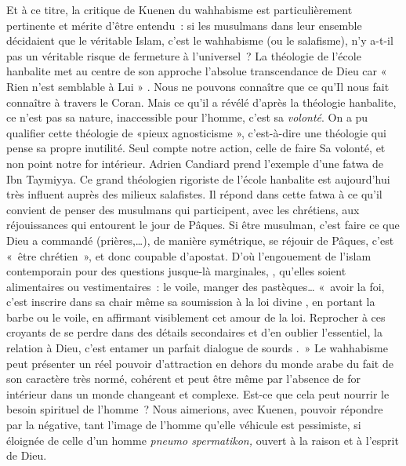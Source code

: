 Et à ce titre, la critique de Kuenen du wahhabisme est particulièrement
pertinente et mérite d'être entendu~: si les musulmans dans leur
ensemble décidaient que le véritable Islam, c'est le wahhabisme (ou le
salafisme), n'y a-t-il pas un véritable risque de fermeture à
l'universel~? La théologie de l'école hanbalite met au
centre de son approche l'absolue transcendance de Dieu car « Rien n'est
semblable à Lui » . Nous ne pouvons connaître
que ce qu'Il nous fait connaître à travers le Coran. Mais ce qu'il a
révélé d'après la théologie hanbalite, ce n'est pas sa nature,
inaccessible pour l'homme, c'est sa \emph{volonté}. On a pu qualifier
cette théologie de «pieux agnosticisme », c'est-à-dire une théologie qui
pense sa propre inutilité. Seul compte notre action, celle de faire Sa
volonté, et non point notre for intérieur. Adrien Candiard prend
l'exemple d'une fatwa de Ibn Taymiyya. Ce grand théologien rigoriste de
l'école hanbalite est aujourd'hui très influent auprès des milieux
salafistes. Il répond dans cette fatwa à ce qu'il convient de penser des
musulmans qui participent, avec les chrétiens, aux réjouissances qui
entourent le jour de Pâques. Si être musulman, c'est faire ce que Dieu a
commandé (prières,\ldots), de manière symétrique, se réjouir de Pâques,
c'est «~être chrétien~», et donc coupable d'apostat. D'où l'engouement
de l'islam contemporain pour des questions jusque-là marginales, ,
qu'elles soient alimentaires ou vestimentaires~: le voile, manger des
pastèques\ldots{} «~avoir la foi, c'est inscrire dans sa chair même sa
soumission à la loi divine , en portant la barbe ou le voile, en
affirmant visiblement cet amour de la loi. Reprocher à ces croyants de
se perdre dans des détails secondaires et d'en oublier l'essentiel, la
relation à Dieu, c'est entamer un parfait dialogue de sourds
.~» Le wahhabisme peut
présenter un réel pouvoir d'attraction en dehors du monde arabe du fait
de son caractère très normé, cohérent et peut être même par l'absence de
for intérieur dans un monde changeant et complexe. Est-ce que cela peut
nourrir le besoin spirituel de l'homme~? Nous aimerions, avec Kuenen,
pouvoir répondre par la négative, tant l'image de l'homme qu'elle
véhicule est pessimiste, si éloignée de celle d'un homme \emph{pneumo
spermatikon,} ouvert à la raison et à l'esprit de Dieu.

